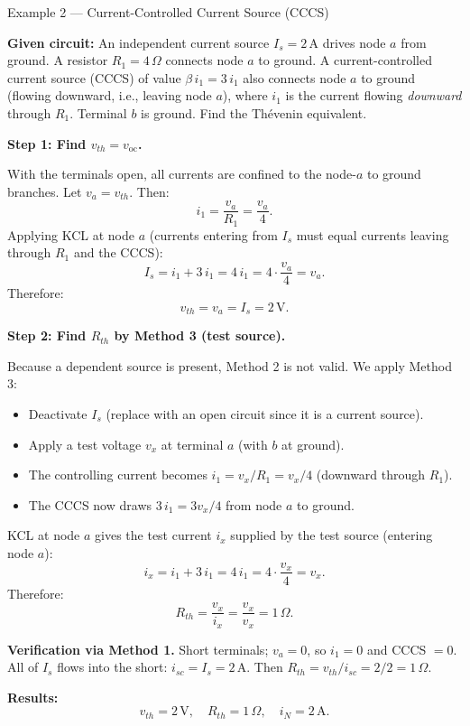 \documentclass[twoside]{article}
\begin{document}
\begin{greenbox}{}{Example 2 — Current-Controlled Current Source (CCCS)}

\textbf{Given circuit:} An independent current source $I_s = 2\,\mathrm{A}$ drives node $a$ from ground.  A resistor $R_1 = 4\,\Omega$ connects node $a$ to ground.  A current-controlled current source (CCCS) of value $\beta\,i_1 = 3\,i_1$ also connects node $a$ to ground (flowing downward, i.e., leaving node $a$), where $i_1$ is the current flowing \emph{downward} through $R_1$.  Terminal $b$ is ground.  Find the Th\'{e}venin equivalent.

\textbf{Step 1: Find $v_{th} = v_{\mathrm{oc}}$.}

With the terminals open, all currents are confined to the node-$a$ to ground branches.  Let $v_a = v_{th}$.  Then:
\[
    i_1 = \frac{v_a}{R_1} = \frac{v_a}{4}.
\]
Applying KCL at node $a$ (currents entering from $I_s$ must equal currents leaving through $R_1$ and the CCCS):
\[
    I_s = i_1 + 3\,i_1 = 4\,i_1 = 4 \cdot \frac{v_a}{4} = v_a.
\]
Therefore:
\[
    v_{th} = v_a = I_s = 2\,\mathrm{V}.
\]

\textbf{Step 2: Find $R_{th}$ by Method 3 (test source).}

Because a dependent source is present, Method 2 is not valid.  We apply Method 3:
\begin{itemize}
    \item Deactivate $I_s$ (replace with an open circuit since it is a current source).
    \item Apply a test voltage $v_x$ at terminal $a$ (with $b$ at ground).
    \item The controlling current becomes $i_1 = v_x/R_1 = v_x/4$ (downward through $R_1$).
    \item The CCCS now draws $3\,i_1 = 3v_x/4$ from node $a$ to ground.
\end{itemize}
KCL at node $a$ gives the test current $i_x$ supplied by the test source (entering node $a$):
\[
    i_x = i_1 + 3\,i_1 = 4\,i_1 = 4 \cdot \frac{v_x}{4} = v_x.
\]
Therefore:
\[
    R_{th} = \frac{v_x}{i_x} = \frac{v_x}{v_x} = 1\,\Omega.
\]

\textbf{Verification via Method 1.} Short terminals; $v_a = 0$, so $i_1 = 0$ and CCCS $= 0$. All of $I_s$ flows into the short: $i_{sc} = I_s = 2\,\mathrm{A}$.  Then $R_{th} = v_{th}/i_{sc} = 2/2 = 1\,\Omega$. \checkmark

\textbf{Results:}
\[
    \boxed{v_{th} = 2\,\mathrm{V}, \quad R_{th} = 1\,\Omega, \quad i_N = 2\,\mathrm{A}.}
\]

\end{greenbox}
\end{document}
